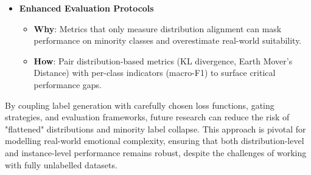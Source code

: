 \begin{itemize}
    \item \textbf{Enhanced Evaluation Protocols}
    \begin{itemize}
        \item \textbf{Why}: Metrics that only measure distribution alignment can mask performance on minority classes and overestimate real-world suitability.
        \item \textbf{How}: Pair distribution-based metrics (KL divergence, Earth Mover’s Distance) with per-class indicators (macro-F1) to surface critical performance gaps.
    \end{itemize}
\end{itemize}

By coupling label generation with carefully chosen loss functions, gating strategies, and evaluation frameworks, future research can reduce the risk of "flattened" distributions and minority label collapse. This approach is pivotal for modelling real-world emotional complexity, ensuring that both distribution-level and instance-level performance remains robust, despite the challenges of working with fully unlabelled datasets.



